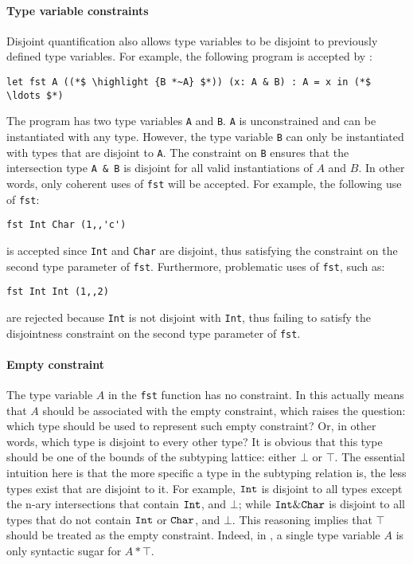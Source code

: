 \paragraph{Type variable constraints}
Disjoint quantification also allows type variables to be disjoint 
to previously defined type variables. For example, the following
program is accepted by \name:
\begin{lstlisting}
let fst A ((*$ \highlight {B *~A} $*)) (x: A & B) : A = x in (*$ \ldots $*)
\end{lstlisting}
The program has two type variables \lstinline{A} and \lstinline{B}. 
\lstinline{A} is unconstrained and can be instantiated with any type. 
However, the type variable \lstinline{B} can only be instantiated
with types that are disjoint to \lstinline{A}. 
The constraint on \lstinline{B} ensures that the
intersection type \lstinline{A & B} is disjoint for all valid instantiations of $A$ and $B$.
In other words, only coherent uses of \lstinline$fst$ will be accepted.
For example, the following use of \lstinline$fst$:
\begin{lstlisting}
fst Int Char (1,,'c')
\end{lstlisting}
is accepted since \lstinline$Int$ and \lstinline$Char$ are disjoint, thus satisfying the constraint
on the second type parameter of \lstinline$fst$.
Furthermore, problematic uses of \lstinline$fst$, such as:
\begin{lstlisting}
fst Int Int (1,,2)
\end{lstlisting}
\noindent are rejected because \lstinline$Int$ is not disjoint with \lstinline$Int$, thus failing to satisfy the
disjointness constraint on the second type parameter of \lstinline$fst$.

\paragraph{Empty constraint}
The type variable $A$ in the \lstinline$fst$ function has no constraint.
In \name this actually means that $A$ should be associated with the empty constraint,
which raises the question: which type should be used to represent such empty constraint?
Or, in other words, which type is disjoint to every other type? 
It is obvious that this type should be one of the bounds of the subtyping lattice: either $\bot$ or
$\top$.
The essential intuition here is that the more specific a type in the subtyping relation is, the less types
exist that are disjoint to it.
For example, $\texttt{Int}$ is disjoint to all types except the n-ary intersections that contain $\texttt{Int}$, 
and $\bot$; while $\texttt{Int} \& \texttt{Char}$ is disjoint to all types that do not contain $\texttt{Int}$ or
$\texttt{Char}$, and $\bot$.
This reasoning implies that $\top$ should be treated as the empty constraint.
Indeed, in \name, a single type variable $A$ is only syntactic sugar
for $A * \top$.

